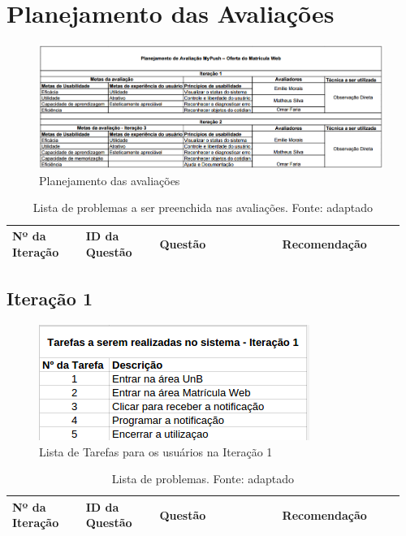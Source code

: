 \chapter{Planejamento das Avaliações}

\begin{figure}[h!]
  \centering
    \includegraphics[keepaspectratio=true, scale=0.5]{figuras/planejamentoavaliacoes.png}
  \caption{Planejamento das avaliações}
\end{figure}

% 
\begin{table}[!h]
\caption{Lista de problemas a ser preenchida nas avaliações. Fonte: \cite{preece} adaptado}
\label{Rotulo}
  \begin{tabular}{p{0.18\linewidth}p{0.18\linewidth}p{0.30\linewidth}p{0.30\linewidth}}
  \hline
    Nº da Iteração & ID da Questão & Questão & Recomendação\\
 \hline
  \end{tabular}
\end{table}
  
\pagebreak

\section{Iteração 1}

\begin{figure}[h!]
  \centering
    \includegraphics[keepaspectratio=true, scale=0.7]{figuras/tarefas1.png}
  \caption{Lista de Tarefas para os usuários na Iteração 1}
\end{figure}

\begin{table}[!h]
\caption{Lista de problemas. Fonte: \cite{preece} adaptado}
\label{Rotulo}
  \begin{tabular}{p{0.18\linewidth}p{0.18\linewidth}p{0.30\linewidth}p{0.30\linewidth}}
  \hline
    Nº da Iteração & ID da Questão & Questão & Recomendação\\
 \hline
  \end{tabular}
\end{table}